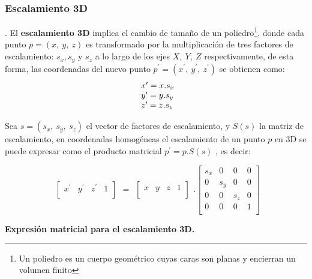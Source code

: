 \subsubsection{Escalamiento 3D}
 \citep{Matias2007}.
El \textbf{escalamiento 3D} implica el cambio de tamaño de un poliedro\footnote{Un poliedro es un cuerpo geométrico cuyas caras son planas y encierran un volumen finito}, donde cada punto $p = (x,\ y,\ z)$ es transformado por la multiplicación de tres factores de escalamiento: $s_{x}, s_{y}$ y $s_{z}$ a lo largo de los ejes $X,\ Y,\ Z$ respectivamente, de esta forma, las coordenadas del nuevo punto $p^{\prime} = ({x}^{ \prime},\ {y}^{ \prime},\ {z}^{ \prime})$ se obtienen como:
$$
\begin{array}{l@{}l}
{x}^{\prime} = x.s_{x}
\\
{y}^{\prime} = y.s_{y}
\\
{z}^{\prime} = z.s_{z}
\end{array}
$$


Sea $s = (s_{x},\ s_{y},\ s_{z})$ el vector de factores de escalamiento, y $S(s)$ la matriz de
escalamiento, en coordenadas homogéneas el escalamiento de un punto $p$ en 3D se puede expresar como el producto matricial
$p^{\prime} = p.S(s)$ , es decir:

\begin{equation}
\begin{array}{rccl}
\left[
\begin{array}{rccl}
{x}^{\prime} & {y}^{\prime} & {z}^{\prime} & 1\\
\end{array}
\right]
\end{array}
=
\begin{array}{rccl}
\left[
\begin{array}{rccl}
x & y & z & 1\\
\end{array}
\right]
\end{array} 
.
\left[
\begin{array}{rccl}
s_{x} & 0 & 0 & 0\\
0 & s_{y} & 0 & 0\\
0 & 0 & s_{z} & 0\\
0 & 0 & 0 & 1\\
\end{array}
\right]   
\end{equation}


\begin{center}
\textbf{\footnotesize{Expresión matricial para el escalamiento 3D.}}
\end{center}


